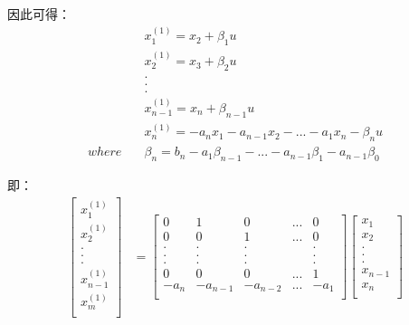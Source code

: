 \documentclass{article}
\numberwithin{equation}{section}
\numberwithin{figure}{section}
\begin{document}
因此可得：
\begin{equation}
    \begin{split}
        &x_1^{(1)}=x_2+\beta_1u\\
        &x_2^{(1)}=x_3+\beta_2u\\
        &.\\
        &.\\
        &.\\
        &x_{n-1}^{(1)}=x_{n}+\beta_{n-1}u\\
        &x_n^{(1)}=-a_nx_1-a_{n-1}x_2-...-a_1x_n-\beta_nu\\
        where \quad &\beta_n=b_n-a_1\beta_{n-1}-...-a_{n-1}\beta_1-a_{n-1}\beta_0
    \end{split}
\end{equation}

即：
\begin{equation}
    \begin{split}
        \begin{bmatrix}
            x^{(1)}_1\\
            x^{(1)}_2\\
            .\\
            .\\
            .\\
            x^{(1)}_{n-1}\\
            x^{(1)}_m\\
        \end{bmatrix}
        &=
        \begin{bmatrix}
            0&1&0&...&0\\
            0&0&1&...&0\\
            .&.&.& &.\\
            .&.&.& &.\\
            .&.&.& &.\\
            0&0&0&...&1\\
            -a_n&-a_{n-1}&-a_{n-2}&...&-a_1\\
        \end{bmatrix}
        \begin{bmatrix}
            x_1\\
            x_2\\
            .\\
            .\\
            .\\
            x_{n-1}\\
            x_n\\

\end{bmatrix}
\end{split}
\end{equation}
\end{document}
